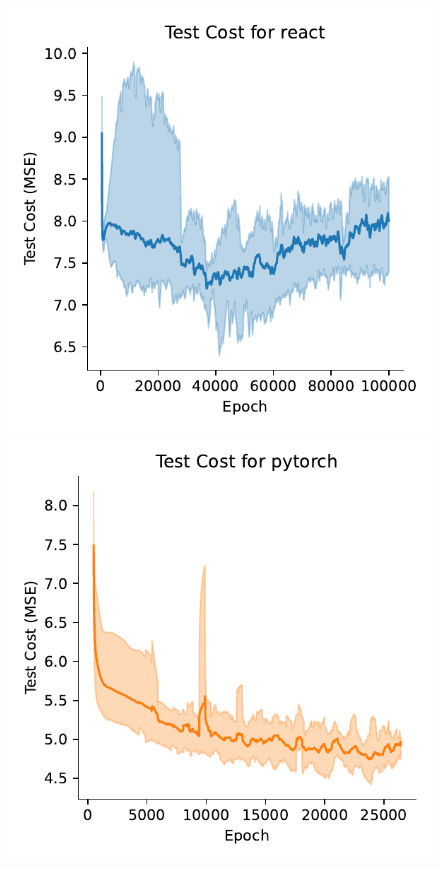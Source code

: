 \documentclass{article}
\begin{document}
\begin{figure}[H]
  \begin{minipage}{0.33\textwidth}
    \centering
    \includegraphics[width=\linewidth]{figures/basic_test_cost_react.pdf}
  \end{minipage}%
  \begin{minipage}{0.33\textwidth}
    \centering
    \includegraphics[width=\linewidth]{figures/basic_test_cost_pytorch.pdf}

\end{minipage}
\end{figure}
\end{document}
